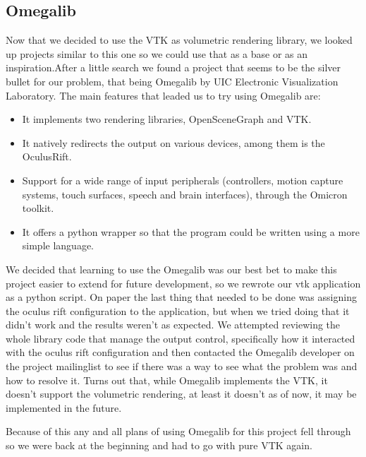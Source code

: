 \documentclass[11pt]{article} %
\begin{document}
\subsection{Omegalib}
Now that we decided to use the VTK as volumetric rendering library, we looked up projects similar to this one so we could use that as a base or as an inspiration.After a little search we found a project that seems to be the silver bullet for our problem, that being Omegalib by UIC Electronic Visualization Laboratory.
\newline
\newline
The main features that leaded us to try using Omegalib are:
\begin{itemize}
\item It implements two rendering libraries, OpenSceneGraph and VTK.
\item It natively redirects  the output on various devices, among them is the OculusRift.
\item Support for a wide range of input peripherals (controllers, motion  capture systems, touch surfaces, speech and brain interfaces), through  the  Omicron toolkit.
\item It offers a python wrapper so that the program could be written using a more simple language.
\end{itemize}

\noindent
We decided that learning to use the Omegalib was our best bet to make this project easier to extend for future development, so we rewrote our vtk application as a python script.
On paper the last thing that needed to be done was assigning the oculus rift configuration to the application, but when we tried doing that it didn't work and the results weren't as expected.
We attempted  reviewing the whole library code that manage the output control, specifically how it interacted with the oculus rift configuration and then contacted the Omegalib developer on the project mailinglist to see if there was a way to see what the problem was and how to resolve it.
Turns out that, while Omegalib implements the VTK, it doesn't support the volumetric rendering, at least it doesn't as of now, it may be implemented in the future.

Because of this any and all plans of using Omegalib for this project fell through so we were back at the beginning and had to go with pure VTK again.
\end{document}
